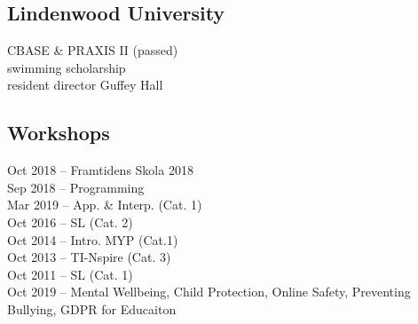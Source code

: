 \documentclass[a4paper]{deedy-resume}
\newcommand{\cvblue}[1]{{\color{cvblue}{#1}}}
\newcommand{\itemit}{\cvblue{$\odot$ \,}}
\begin{document}
\begin{minipage}[t]{0.66\textwidth}
\begin{multicols}{2}
\subsection{Lindenwood University}
\itemit CBASE \& PRAXIS II (passed) \\
\itemit swimming scholarship\\
\itemit resident director Guffey Hall\\
\columnbreak
\subsection{Workshops}
\itemit{Oct 2018 -- Framtidens Skola 2018}\\
\itemit{Sep 2018 -- Programming}\\
\itemit{Mar 2019 -- App. \& Interp. (Cat. 1)}\\
\itemit{Oct 2016 -- SL (Cat. 2)}\\
\itemit{Oct 2014 -- Intro. MYP (Cat.1)}\\
\itemit{Oct 2013 -- TI-Nspire (Cat. 3)}\\
\itemit{Oct 2011 -- SL (Cat. 1)} \\
\itemit{Oct 2019 -- Mental Wellbeing, Child Protection, Online Safety, 
Preventing Bullying, GDPR for Educaiton}
\end{multicols}

\end{minipage} 
\end{document}
